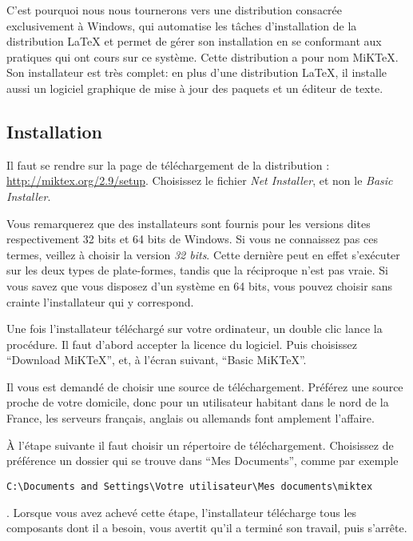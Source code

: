 C'est pourquoi nous nous tournerons vers une distribution consacrée exclusivement à Windows, qui automatise les tâches d'installation de la distribution \LaTeX{} et permet de gérer son installation en se conformant aux pratiques qui ont cours sur ce système. Cette distribution a pour nom MiKTeX. Son installateur est très complet: en plus d'une distribution \LaTeX{}, il installe aussi un logiciel graphique de mise à jour des paquets et un éditeur de texte.

\subsection{Installation}

Il faut se rendre sur la page de téléchargement de la distribution : \url{http://miktex.org/2.9/setup}. Choisissez le fichier \emph{Net Installer}, et non le \emph{Basic Installer}.

\begin{attention}
Vous remarquerez que des installateurs sont fournis pour les versions dites respectivement 32 bits et 64 bits de Windows. Si vous ne connaissez pas ces termes, veillez à choisir la version \emph{32 bits}. Cette dernière peut en effet s'exécuter sur les deux types de plate-formes, tandis que la réciproque n'est pas vraie. Si vous savez que vous disposez d'un système en 64 bits, vous pouvez choisir sans crainte l'installateur qui y correspond.
\end{attention}

Une fois l'installateur téléchargé sur votre ordinateur, un double clic lance la procédure. Il faut d'abord accepter la licence du logiciel. Puis choisissez \enquote{Download MiKTeX}, et, à l'écran suivant, \enquote{Basic MiKTeX}.

Il vous est demandé de choisir une source de téléchargement. Préférez une source proche de votre domicile, donc pour un utilisateur habitant dans le nord de la France, les serveurs français, anglais ou allemands font amplement l'affaire.

À l'étape suivante il faut choisir un répertoire de téléchargement. Choisissez de préférence un dossier qui se trouve dans \enquote{Mes Documents}, comme par exemple \begin{english}\verb|C:\Documents and Settings\Votre utilisateur\Mes documents\miktex|\end{english}. Lorsque vous avez achevé cette étape, l'installateur télécharge tous les composants dont il a besoin, vous avertit qu'il a terminé son travail, puis s'arrête.

